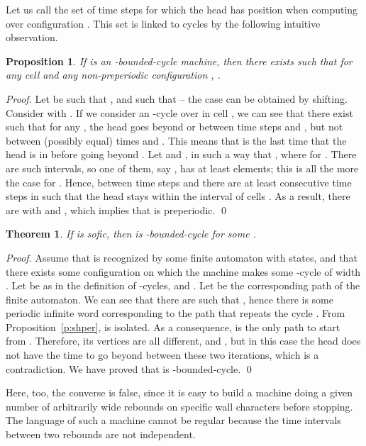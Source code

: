 \documentclass{llncs}
\newtheorem{teo}{Theorem}
\newtheorem{prop}{Proposition}
\begin{document}
Let us call  the set of time steps for which the head has position  when computing over configuration .
This set is linked to cycles by the following intuitive observation.
\begin{prop}\label{p:zzbound}
If  is an -bounded-cycle machine, then there exists  such that for any cell  and any non-preperiodic configuration , .
\end{prop}
\begin{proof}
Let  be such that , and  such that  -- the case  can be obtained by shifting.
Consider  with .
If we consider an -cycle over  in cell , we can see that there exist  such that for any , the head goes beyond  or  between time steps  and , but not between (possibly equal) times  and .
This means that  is the last time that the head is in  before going beyond .
Let  and , in such a way that , where  for . 
There are  such intervals, so one of them, say , has at least  elements; this is all the more the case for .
Hence, between time steps  and  there are at least  consecutive time steps in  such that the head stays within the interval of cells .
As a result, there are  with  and , which implies that  is preperiodic.
\qed\end{proof}
\begin{teo}
If  is sofic, then  is -bounded-cycle for some .
\end{teo}
\begin{proof}
Assume that  is recognized by some finite automaton with  states, and that there exists some configuration  on which the machine makes some -cycle of width .
Let  be as in the definition of -cycles, and .
Let  be the corresponding path of the finite automaton.
We can see that there are  such that , hence there is some periodic infinite word  corresponding to the path  that repeats the cycle .
From Proposition~\ref{p:shper},  is isolated.
As a consequence,  is the only path to start from .
Therefore, its vertices are all different, and , but in this case the head does not have the time to go beyond  between these two iterations, which is a contradiction.
We have proved that  is -bounded-cycle.
\qed
\end{proof}
Here, too, the converse is false, since it is easy to build a machine doing a given number of arbitrarily wide rebounds on specific wall characters before stopping.
The language of such a machine cannot be regular because the time intervals between two rebounds are not independent.
\end{document}
